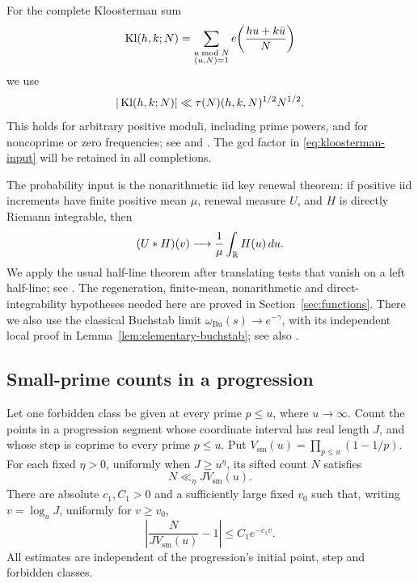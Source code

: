 For the complete Kloosterman sum
\[
 \operatorname{Kl}(h,k;N)=\sum_{\substack{u\bmod N\\(u,N)=1}}
 e\!\left(\frac{hu+k\bar u}{N}\right)
\]
we use
\begin{equation}\label{eq:kloosterman-input}
 |\operatorname{Kl}(h,k;N)|\ll \tau(N)(h,k,N)^{1/2}N^{1/2}.
\end{equation}
This holds for arbitrary positive moduli, including prime powers, and
for noncoprime or zero frequencies; see
\cite[Lemma~7.1]{Lichtman2022} and
\cite[Corollary~11.12, p.~280]{IwaniecKowalski2004}. The gcd factor in
\eqref{eq:kloosterman-input} will be retained in all completions.

The probability input is the nonarithmetic iid key renewal theorem:
if positive iid increments have finite positive mean $\mu$, renewal
measure $U$, and $H$ is directly Riemann integrable, then
\begin{equation}\label{eq:renewal-input}
 (U*H)(v)\longrightarrow\frac1\mu\int_\mathbb R H(u)\,du.
\end{equation}
We apply the usual half-line theorem after translating tests that vanish
on a left half-line; see \cite[Section~2.7, Theorem~35]{Serfozo2009}.
The regeneration, finite-mean, nonarithmetic and direct-integrability
hypotheses needed here are proved in Section~\ref{sec:functions}.
There we also use the classical Buchstab limit
$\omega_{\mathrm{Bu}}(s)\to e^{-\gamma}$, with its independent local
proof in Lemma~\ref{lem:elementary-buchstab}; see also
\cite[Section~28.9, p.~236]{MontgomeryVaughanIII}.

\subsection{Small-prime counts in a progression}

\begin{lemma}\label{lem:small-sieve}
Let one forbidden class be given at every prime $p\le u$, where
$u\to\infty$. Count the points in a progression segment whose coordinate
interval has real length $J$, and whose step is coprime to every prime
$p\le u$. Put $V_{\mathrm{sm}}(u)=\prod_{p\le u}(1-1/p)$.
For each fixed $\eta>0$, uniformly when $J\ge u^\eta$, its sifted count
$N$ satisfies
\begin{equation}\label{eq:small-upper}
 N\ll_\eta JV_{\mathrm{sm}}(u).
\end{equation}
There are absolute $c_1,C_1>0$ and a sufficiently large fixed $v_0$
such that, writing $v=\log_uJ$, uniformly for $v\ge v_0$,
\begin{equation}\label{eq:small-relative}
 \left|\frac{N}{JV_{\mathrm{sm}}(u)}-1\right|\le C_1e^{-c_1v}.
\end{equation}
All estimates are independent of the progression's initial point,
step and forbidden classes.
\end{lemma}

